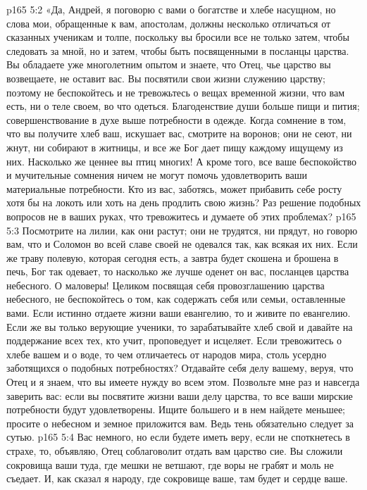 \vs p165 5:2 \pc «Да, Андрей, я поговорю с вами о богатстве и хлебе насущном, но слова мои, обращенные к вам, апостолам, должны несколько отличаться от сказанных ученикам и толпе, поскольку вы бросили все не только затем, чтобы следовать за мной, но и затем, чтобы быть посвященными в посланцы царства. Вы обладаете уже многолетним опытом и знаете, что Отец, чье царство вы возвещаете, не оставит вас. Вы посвятили свои жизни служению царству; поэтому не беспокойтесь и не тревожьтесь о вещах временной жизни, что вам есть, ни о теле своем, во что одеться. Благоденствие души больше пищи и пития; совершенствование в духе выше потребности в одежде. Когда сомнение в том, что вы получите хлеб ваш, искушает вас, смотрите на воронов; они не сеют, ни жнут, ни собирают в житницы, и все же Бог дает пищу каждому ищущему из них. Насколько же ценнее вы птиц многих! А кроме того, все ваше беспокойство и мучительные сомнения ничем не могут помочь удовлетворить ваши материальные потребности. Кто из вас, заботясь, может прибавить себе росту хотя бы на локоть или хоть на день продлить свою жизнь? Раз решение подобных вопросов не в ваших руках, что тревожитесь и думаете об этих проблемах?
\vs p165 5:3 Посмотрите на лилии, как они растут; они не трудятся, ни прядут, но говорю вам, что и Соломон во всей славе своей не одевался так, как всякая их них. Если же траву полевую, которая сегодня есть, а завтра будет скошена и брошена в печь, Бог так одевает, то насколько же лучше оденет он вас, посланцев царства небесного. О маловеры! Целиком посвящая себя провозглашению царства небесного, не беспокойтесь о том, как содержать себя или семьи, оставленные вами. Если истинно отдаете жизни ваши евангелию, то и живите по евангелию. Если же вы только верующие ученики, то зарабатывайте хлеб свой и давайте на поддержание всех тех, кто учит, проповедует и исцеляет. Если тревожитесь о хлебе вашем и о воде, то чем отличаетесь от народов мира, столь усердно заботящихся о подобных потребностях? Отдавайте себя делу вашему, веруя, что Отец и я знаем, что вы имеете нужду во всем этом. Позвольте мне раз и навсегда заверить вас: если вы посвятите жизни ваши делу царства, то все ваши мирские потребности будут удовлетворены. Ищите большего и в нем найдете меньшее; просите о небесном и земное приложится вам. Ведь тень обязательно следует за сутью.
\vs p165 5:4 Вас немного, но если будете иметь веру, если не споткнетесь в страхе, то, объявляю, Отец соблаговолит отдать вам царство сие. Вы сложили сокровища ваши туда, где мешки не ветшают, где воры не грабят и моль не съедает. И, как сказал я народу, где сокровище ваше, там будет и сердце ваше.
